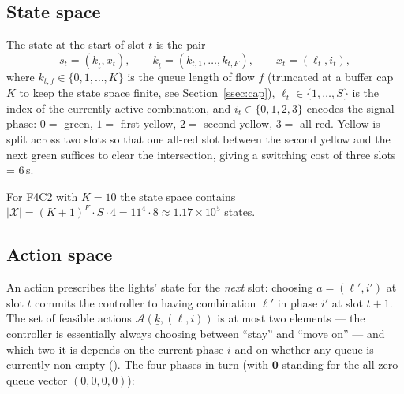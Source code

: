 \documentclass[11pt,a4paper]{article}
\newcommand{\X}{\mathcal{X}}
\newcommand{\A}{\mathcal{A}}
\begin{document}
\subsection{State space}

The state at the start of slot $t$ is the pair
\begin{equation}
    s_t = (\underline{k}_t, x_t),
    \qquad
    \underline{k}_t = (k_{t,1}, \dots, k_{t,F}),
    \qquad
    x_t = (\ell_t, i_t),
\end{equation}
where $k_{t,f} \in \{0, 1, \dots, K\}$ is the queue length of flow $f$
(truncated at a buffer cap $K$ to keep the state space finite, see
Section~\ref{ssec:cap}), $\ell_t \in \{1, \dots, S\}$ is the index of
the currently-active combination, and $i_t \in \{0, 1, 2, 3\}$ encodes
the signal phase: $0 =$ green, $1 =$ first yellow, $2 =$ second
yellow, $3 =$ all-red. Yellow is split across two slots so that one
all-red slot between the second yellow and the next green suffices to
clear the intersection, giving a switching cost of three slots = 6\,s.

For F4C2 with $K = 10$ the state space contains
$|\X| = (K + 1)^F \cdot S \cdot 4 = 11^4 \cdot 8 \approx
1.17 \times 10^5$ states.

\subsection{Action space}

An action prescribes the lights' state for the \emph{next} slot:
choosing $a = (\ell', i')$ at slot $t$ commits the controller to
having combination $\ell'$ in phase $i'$ at slot $t + 1$. The set of
feasible actions $\A(\underline{k}, (\ell, i))$ is at most two
elements --- the controller is essentially always choosing between
``stay'' and ``move on'' --- and which two it is depends on the
current phase $i$ and on whether any queue is currently non-empty
(\cite[\S 3.2]{haijema2008}).
The four phases in turn (with $\mathbf{0}$ standing for the all-zero
queue vector $(0, 0, 0, 0)$):
\end{document}
